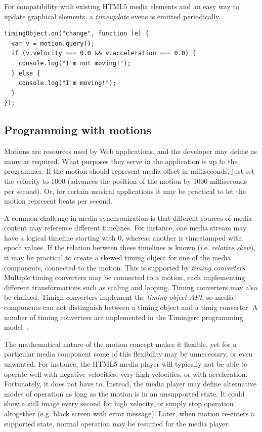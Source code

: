 
For compatibility with existing HTML5 media elements and an easy way to update graphical elements, a \emph{timeupdate} evens is emitted periodically.

\begin{lstlisting}[caption=Monitoring changes to the motion through the change event.]
timingObject.on("change", function (e) {
  var v = motion.query();
  if (v.velocity === 0.0 && v.acceleration === 0.0) {
    console.log("I'm not moving!");
  } else {
    console.log("I'm moving!");
  }
});
\end{lstlisting}


\subsection{Programming with motions}



Motions are resources used by Web applications, and the developer may define
as many as required. What purposes they serve in the application is up to the
programmer. If the motion should represent media offset in milliseconds, just
set the velocity to 1000 (advances the position of the motion by 1000
milliseconds per second). Or, for certain musical applications it may be
practical to let the motion represent beats per second.


A common challenge in media synchronization is that different sources of media
content may reference different timelines. For instance, one media stream may
have a logical timeline starting with 0, whereas another is timestamped with
epoch values. If the relation between these timelines is known (i.e.
\emph{relative skew}), it may be practical to create a skewed timing object
for one of the media components, connected to the motion. This is supported by
\emph{timing converters}. Multiple timing converters may be connected to a
motion, each implementing different transformations such as scaling and
looping. Timing converters may also be chained. Timign converters implement
the \emph{timing object API}, so media components can not distinguish between
a timing object and a timig converter. A number of timing converters are
implemented in the Timingsrc programming model~\cite{timingsrc}.

\label{sec:toomuch}

The mathematical nature of the motion concept makes it flexible, yet for a
particular media component some of this flexibility may be unnecessary, or
even unwanted. For instance, the HTML5 media player will typically not be able
to operate well with negative velocities, very high velocities, or with
acceleration. Fortunately, it does not have to. Instead, the media player may
define alternative modes of operation as long as the motion is in an
unsupported state. It could show a still image every second for high velocity,
or simply stop operation altogether (e.g. black screen with error message).
Later, when motion re-enters a supported state, normal operation may be
resumed for the media player.


